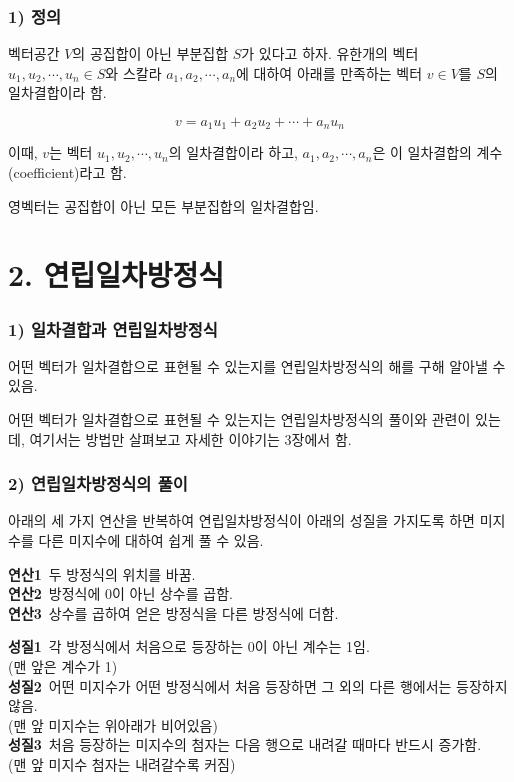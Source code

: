 \subsubsection*{1) 정의\\}
\begin{DEF}
벡터공간 $V$의 공집합이 아닌 부분집합 $S$가 있다고 하자. 유한개의 벡터 $u_1,u_2, \cdots ,u_n \in S$와 스칼라 $a_1,a_2, \cdots , a_n$에 대하여 아래를 만족하는 벡터 $v \in V$를 $S$의 일차결합이라 함.

\[v=a_1u_1+a_2u_2+ \cdots +a_nu_n\]

이때, $v$는 벡터 $u_1,u_2, \cdots , u_n$의 일차결합이라 하고, $a_1,a_2, \cdots , a_n$은 이 일차결합의 계수(coefficient)라고 함.
\end{DEF}

영벡터는 공집합이 아닌 모든 부분집합의 일차결합임.\\


\section*{2. 연립일차방정식}
\subsubsection*{1) 일차결합과 연립일차방정식}
어떤 벡터가 일차결합으로 표현될 수 있는지를 연립일차방정식의 해를 구해 알아낼 수 있음.

어떤 벡터가 일차결합으로 표현될 수 있는지는 연립일차방정식의 풀이와 관련이 있는데, 여기서는 방법만 살펴보고 자세한 이야기는 3장에서 함.

\subsubsection*{2) 연립일차방정식의 풀이}
아래의 세 가지 연산을 반복하여 연립일차방정식이 아래의 성질을 가지도록 하면 미지수를 다른 미지수에 대하여 쉽게 풀 수 있음.

\textbf{연산1} \,두 방정식의 위치를 바꿈.\\
\textbf{연산2} \,방정식에 0이 아닌 상수를 곱함.\\
\textbf{연산3} \,상수를 곱하여 얻은 방정식을 다른 방정식에 더함.

\textbf{성질1} \,각 방정식에서 처음으로 등장하는 0이 아닌 계수는 1임.\\(맨 앞은 계수가 1)\\
\textbf{성질2} \,어떤 미지수가 어떤 방정식에서 처음 등장하면 그 외의 다른 행에서는 등장하지 않음.\\(맨 앞 미지수는 위아래가 비어있음)\\
\textbf{성질3} \,처음 등장하는 미지수의 첨자는 다음 행으로 내려갈 때마다 반드시 증가함.\\(맨 앞 미지수 첨자는 내려갈수록 커짐)


